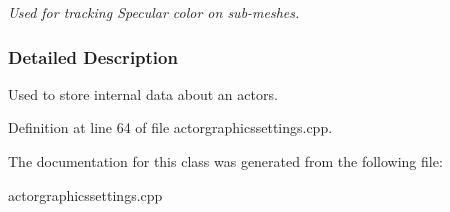 \begin{DoxyCompactItemize}
\begin{DoxyCompactList}\small\item\em Used for tracking Specular color on sub-\/meshes. \item\end{DoxyCompactList}\end{DoxyCompactItemize}


\subsubsection{Detailed Description}
Used to store internal data about an actors. 

Definition at line 64 of file actorgraphicssettings.cpp.



The documentation for this class was generated from the following file:\begin{DoxyCompactItemize}
\item 
actorgraphicssettings.cpp\end{DoxyCompactItemize}
